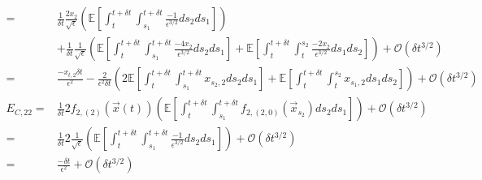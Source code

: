 \documentclass[12pt]{article}
\begin{document}
\begin{equation}
\begin{aligned}
=& 
\frac{1}{\delta t} \frac{2 x_2}{\sqrt{\epsilon}} \left( \mathbb{E} \left[ \int_t^{t+\delta t} \int_{s_1}^{t+\delta t} \frac{-1}{\epsilon^{3/2}} ds_2 ds_1 \right]  \right) \\
&+ \frac{1}{\delta t} \frac{1}{\sqrt{\epsilon}} \left( \mathbb{E} \left[ \int_t^{t+\delta t} \int_{s_1}^{t + \delta t} \frac{-4 x_2}{\epsilon^{3/2}} ds_2 ds_1 \right]
+ \mathbb{E} \left[ \int_t^{t+\delta t} \int_t^{s_2} \frac{-2 x_2}{\epsilon^{3/2}} ds_1 ds_2 \right] \right) 
+ \mathcal{O} (\delta t^{3/2}) \\
=& 
 \frac{- x_{t,2} \delta t}{\epsilon^2}
- \frac{2}{\epsilon^2 \delta t} \left( 2 \mathbb{E} \left[ \int_t^{t+\delta t} \int_{s_1}^{t + \delta t} x_{s_2,2} ds_2 ds_1 \right]
+ \mathbb{E} \left[ \int_t^{t+\delta t} \int_t^{s_2} x_{s_1,2} ds_1 ds_2 \right] \right) 
+ \mathcal{O} (\delta t^{3/2}) \\
E_{C, 22} 
=&
 \frac{1}{\delta t} 2 f_{2,(2)}(\vec{x}(t)) \left( \mathbb{E} \left[ \int_t^{t+\delta t} \int_{s_1}^{t+\delta t} f_{2,(2,0)}(\vec{x}_{s_2}) ds_2 ds_1 \right]  \right) 
+ \mathcal{O} (\delta t^{3/2}) \\
=&
 \frac{1}{\delta t} 2 \frac{1}{\sqrt{\epsilon}} \left( \mathbb{E} \left[ \int_t^{t+\delta t} \int_{s_1}^{t+\delta t} \frac{-1}{\epsilon^{3/2}} ds_2 ds_1 \right]  \right) 
+ \mathcal{O} (\delta t^{3/2})\\
=&
\frac{-\delta t}{\epsilon^2} 
+ \mathcal{O} (\delta t^{3/2})
\end{aligned}
\end{equation}



\end{document}
